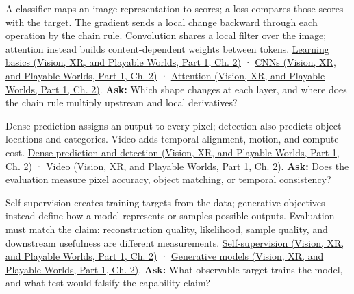 A classifier maps an image representation to scores; a loss compares those scores with the target. The gradient sends a local change backward through each operation by the chain rule. Convolution shares a local filter over the image; attention instead builds content-dependent weights between tokens. \href{../07-Vision-XR-and-Playable-Worlds-P01/main.pdf\#04-visual-computing-ii-ch031-learning-a-visual-classifier-from-examples}{Learning basics (Vision, XR, and Playable Worlds, Part 1, Ch. 2)} · \href{../07-Vision-XR-and-Playable-Worlds-P01/main.pdf\#04-visual-computing-ii-ch031-convolutional-models-preserve-image-neighborhoods}{CNNs (Vision, XR, and Playable Worlds, Part 1, Ch. 2)} · \href{../07-Vision-XR-and-Playable-Worlds-P01/main.pdf\#04-visual-computing-ii-ch031-sequence-models-and-attention}{Attention (Vision, XR, and Playable Worlds, Part 1, Ch. 2)}. \textbf{Ask:} Which shape changes at each layer, and where does the chain rule multiply upstream and local derivatives?

Dense prediction assigns an output to every pixel; detection also predicts object locations and categories. Video adds temporal alignment, motion, and compute cost. \href{../07-Vision-XR-and-Playable-Worlds-P01/main.pdf\#04-visual-computing-ii-ch031-predict-pixels-and-localize-objects}{Dense prediction and detection (Vision, XR, and Playable Worlds, Part 1, Ch. 2)} · \href{../07-Vision-XR-and-Playable-Worlds-P01/main.pdf\#04-visual-computing-ii-ch031-video-adds-motion-and-temporal-cost}{Video (Vision, XR, and Playable Worlds, Part 1, Ch. 2)}. \textbf{Ask:} Does the evaluation measure pixel accuracy, object matching, or temporal consistency?

Self-supervision creates training targets from the data; generative objectives instead define how a model represents or samples possible outputs. Evaluation must match the claim: reconstruction quality, likelihood, sample quality, and downstream usefulness are different measurements. \href{../07-Vision-XR-and-Playable-Worlds-P01/main.pdf\#04-visual-computing-ii-ch031-self-supervision-and-evaluation}{Self-supervision (Vision, XR, and Playable Worlds, Part 1, Ch. 2)} · \href{../07-Vision-XR-and-Playable-Worlds-P01/main.pdf\#04-visual-computing-ii-ch031-generative-models-learn-distributions-and-samplers}{Generative models (Vision, XR, and Playable Worlds, Part 1, Ch. 2)}. \textbf{Ask:} What observable target trains the model, and what test would falsify the capability claim?

